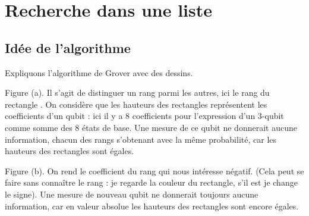 \documentclass[11pt,class=report,crop=false]{standalone}
\begin{document}







\section{Recherche dans une liste}

\subsection{Idée de l'algorithme}

Expliquons l'algorithme de Grover avec des dessins. 


Figure (a). Il s'agit de distinguer un rang parmi les autres, ici le rang du rectangle . On considère que les hauteurs des rectangles représentent les coefficients d'un qubit : ici il y a $8$ coefficients pour l'expression d'un $3$-qubit comme somme des $8$ états de base. Une mesure de ce qubit 
ne donnerait aucune information, chacun des rangs s'obtenant avec la même probabilité, car les hauteurs des rectangles sont égales.

\smallskip

Figure (b). On rend le coefficient du rang qui nous intéresse négatif. (Cela peut se faire sans connaître le rang : je regarde la couleur du rectangle, s'il est  je change le signe).
Une mesure de nouveau qubit ne donnerait toujours aucune information, car en valeur absolue les hauteurs des rectangles sont encore égales.
\end{document}
